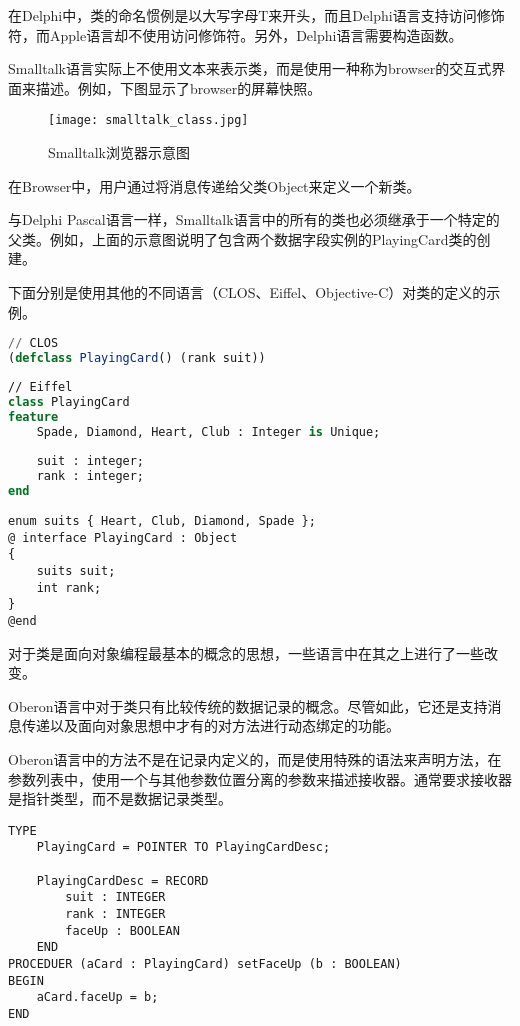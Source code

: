 在Delphi中，类的命名惯例是以大写字母T来开头，而且Delphi语言支持访问修饰符，而Apple语言却不使用访问修饰符。另外，Delphi语言需要构造函数。


Smalltalk语言实际上不使用文本来表示类，而是使用一种称为browser的交互式界面来描述。例如，下图显示了browser的屏幕快照。

\begin{figure}[htbp]
\centering
\texttt{[image: smalltalk\_class.jpg]}
\caption{Smalltalk浏览器示意图}
\label{fig:smalltalk_class}
\end{figure}

在Browser中，用户通过将消息传递给父类Object来定义一个新类。

与Delphi Pascal语言一样，Smalltalk语言中的所有的类也必须继承于一个特定的父类。例如，上面的示意图说明了包含两个数据字段实例的PlayingCard类的创建。

下面分别是使用其他的不同语言（CLOS、Eiffel、Objective-C）对类的定义的示例。



\begin{lstlisting}[language=Lisp]
// CLOS
(defclass PlayingCard() (rank suit))
\end{lstlisting}






\begin{lstlisting}[language=Eiffel]
// Eiffel
class PlayingCard
feature 
	Spade, Diamond, Heart, Club : Integer is Unique;
	
	suit : integer;
	rank : integer;
end
\end{lstlisting}





\begin{lstlisting}[language={[Objective]C}]
enum suits { Heart, Club, Diamond, Spade };
@ interface PlayingCard : Object
{
	suits suit;
	int rank;
}
@end
\end{lstlisting}


对于类是面向对象编程最基本的概念的思想，一些语言中在其之上进行了一些改变。

Oberon语言中对于类只有比较传统的数据记录的概念。尽管如此，它还是支持消息传递以及面向对象思想中才有的对方法进行动态绑定的功能。

Oberon语言中的方法不是在记录内定义的，而是使用特殊的语法来声明方法，在参数列表中，使用一个与其他参数位置分离的参数来描述接收器。通常要求接收器是指针类型，而不是数据记录类型。

\begin{lstlisting}[language=Oberon-2]
TYPE
	PlayingCard = POINTER TO PlayingCardDesc;
		
	PlayingCardDesc = RECORD
		suit : INTEGER
		rank : INTEGER
		faceUp : BOOLEAN
	END
PROCEDUER (aCard : PlayingCard) setFaceUp (b : BOOLEAN)
BEGIN
	aCard.faceUp = b;
END
\end{lstlisting}


